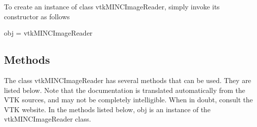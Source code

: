 To create an instance of class vtk\-M\-I\-N\-C\-Image\-Reader, simply invoke its constructor as follows \begin{DoxyVerb}  obj = vtkMINCImageReader
\end{DoxyVerb}
 \hypertarget{vtkwidgets_vtkxyplotwidget_Methods}{}\subsection{Methods}\label{vtkwidgets_vtkxyplotwidget_Methods}
The class vtk\-M\-I\-N\-C\-Image\-Reader has several methods that can be used. They are listed below. Note that the documentation is translated automatically from the V\-T\-K sources, and may not be completely intelligible. When in doubt, consult the V\-T\-K website. In the methods listed below, {\ttfamily obj} is an instance of the vtk\-M\-I\-N\-C\-Image\-Reader class. 
